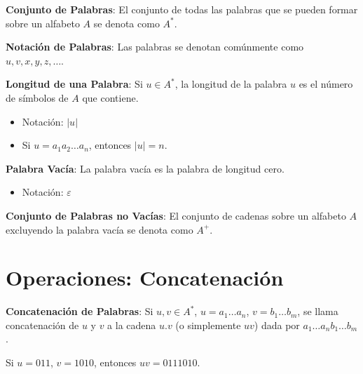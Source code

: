 \documentclass[12pt]{book} %
\begin{document}
\begin{definicion}
\textbf{Conjunto de Palabras}: El conjunto de todas las palabras que se pueden formar sobre un alfabeto $A$ se denota como $A^*$.  
\end{definicion}

\begin{definicion}
\textbf{Notación de Palabras}: Las palabras se denotan comúnmente como $u, v, x, y, z, \ldots$.  
\end{definicion}

\begin{definicion}
\textbf{Longitud de una Palabra}: Si $u \in A^*$, la longitud de la palabra $u$ es el número de símbolos de $A$ que contiene.  
\begin{itemize}
    \item Notación: $\lvert u \rvert$  
    \item Si $u = a_1 a_2 \ldots a_n$, entonces $\lvert u \rvert = n$.  
\end{itemize}
\end{definicion}

\begin{definicion}
\textbf{Palabra Vacía}: La palabra vacía es la palabra de longitud cero.  
\begin{itemize}
    \item Notación: $\varepsilon$  
\end{itemize}
\end{definicion}

\begin{definicion}
\textbf{Conjunto de Palabras no Vacías}: El conjunto de cadenas sobre un alfabeto $A$ excluyendo la palabra vacía se denota como $A^+$.  
\end{definicion}

\hypertarget{operaciones-concatenaciuxf3n}{%
\section{Operaciones:
Concatenación}\label{operaciones-concatenaciuxf3n}}

\begin{definicion}
\textbf{Concatenación de Palabras}: Si $u, v \in A^*$, $u = a_1 \ldots a_n$, $v = b_1 \ldots b_m$, se llama concatenación de $u$ y $v$ a la cadena $u.v$ (o simplemente $uv$) dada por $a_1 \ldots a_n b_1 \ldots b_m$.
\end{definicion}

\begin{ejemplo}
Si $u = 011$, $v = 1010$, entonces $uv = 0111010$.
\end{ejemplo}
\end{document}
